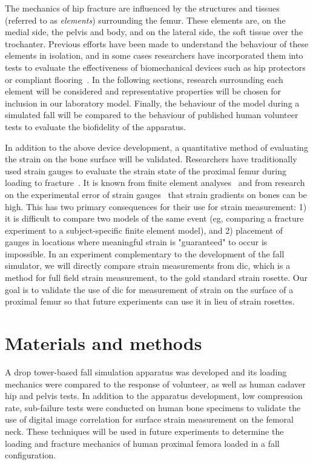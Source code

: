 The mechanics of hip fracture are influenced by the structures and tissues (referred to as \emph{elements}) surrounding the femur.
These elements are, on the medial side, the pelvis and body, and on the lateral side, the soft tissue over the trochanter.
Previous efforts have been made to understand the behaviour of these elements in isolation, and in some cases researchers have incorporated them into tests to evaluate the effectiveness of biomechanical devices such as hip protectors or compliant flooring~\citep{robinovitch_hip_2009, laing_force_2008,laing_effect_2006}.
In the following sections, research surrounding each element will be considered and representative properties will be chosen for inclusion in our laboratory model.
Finally, the behaviour of the model during a simulated fall will be compared to the behaviour of published human volunteer tests to evaluate the biofidelity of the apparatus.

In addition to the above device development, a quantitative method of evaluating the strain on the bone surface will be validated.
Researchers have traditionally used strain gauges to evaluate the strain state of the proximal femur during loading to fracture~\citep{cristofolini_vitro_2007}.
It is known from finite element analyses~\citep{verhulp_comparison_2006} and from research on the experimental error of strain gauges~\citep{cristofolini_vitro_1997} that strain gradients on bones can be high.
This has two primary consequences for their use for strain measurement: 1) it is difficult to compare two models of the same event (\ac{eg}, comparing a fracture experiment to a subject-specific finite element model), and 2) placement of gauges in locations where meaningful strain is "guaranteed" to occur is impossible.
In an experiment complementary to the development of the fall simulator, we will directly compare strain measurements from \acf{dic}, which is a method for full field strain measurement, to the gold standard strain rosette.
Our goal is to validate the use of \ac{dic} for measurement of strain on the surface of a proximal femur so that future experiments can use it in lieu of strain rosettes.

\section{Materials and methods}
\label{sec:fall_sim_design_methods}
A drop tower-based fall simulation apparatus was developed and its loading mechanics were compared to the response of volunteer, as well as human cadaver hip and pelvis tests.
In addition to the apparatus development, low compression rate, sub-failure tests were conducted on human bone specimens to validate the use of digital image correlation for surface strain measurement on the femoral neck.
These techniques will be used in future experiments to determine the loading and fracture mechanics of human proximal femora loaded in a fall configuration.

